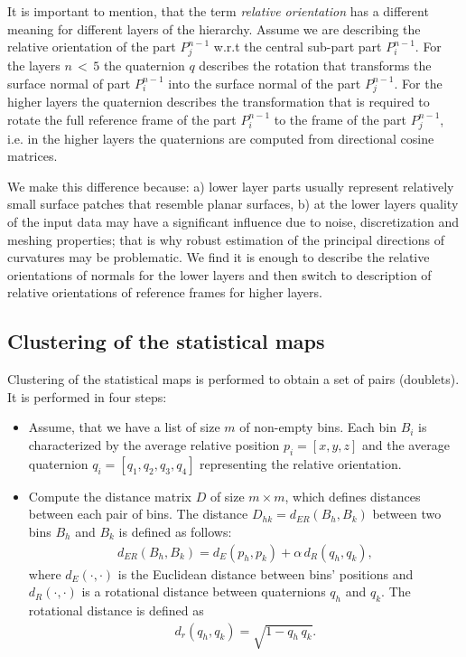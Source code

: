 \documentclass[conference]{IEEEtran}
\begin{document}
{    It is important to mention, that the term \emph{relative orientation}
    has a different meaning for different layers of the hierarchy. Assume
    we are describing the relative orientation of the part $P_j^{n-1}$ w.r.t the central sub-part
    part $P_i^{n-1}$. For the layers $n\,{<}\,5$ the quaternion $q$ describes
    the rotation that transforms the surface normal of part $P_i^{n-1}$ into the surface normal
    of the part $P_j^{n-1}$. For the higher layers the quaternion
    describes the
    transformation that is required to rotate the full reference frame of the part $P_i^{n-1}$ to the
    frame of the part $P_j^{n-1}$, i.e. in the higher layers the quaternions are computed from
    directional cosine matrices.

    We make this difference because: a) lower layer parts usually represent relatively small
    surface patches that resemble planar surfaces, b) at the lower layers
    quality of the input data may have a significant influence due to noise,
    discretization and meshing properties; that is why robust estimation of the principal
    directions of curvatures may be problematic. We find it is enough to
    describe the
    relative orientations of normals for the lower layers and then
    switch to description of relative orientations of reference frames for higher layers.



\subsection{Clustering of the statistical maps\label{sec:Clustering}}

Clustering of the statistical maps is performed to obtain a set of
pairs (doublets). It is performed in four steps:

\begin{itemize}
    \item Assume, that we have a list of size $m$ of non-empty bins. Each bin $B_i$ is
    characterized by the average relative position $p_i = [x,y,z]$ and the average quaternion $q_i = [q_1,q_2,q_3,q_4]$ representing
    the relative orientation.
    \item Compute the distance matrix $D$ of size $m \times m$,
    which defines distances between each pair of bins.
    The distance $D_{hk} = d_{ER}(B_h, B_k)$ between two bins $B_h$ and $B_k$ is defined as follows:
    \begin{align}
        d_{ER}(B_h, B_k) = d_E(p_h, p_k) + \alpha \, d_R(q_h, q_k),
    \end{align}
    where $d_E(\cdot,\cdot)$ is the Euclidean distance between
    bins' positions and $d_R(\cdot,\cdot)$ is a rotational distance
    between quaternions $q_h$ and $q_k$.
    The rotational distance is defined as
    \begin{align}
        d_r(q_h, q_k) = \sqrt{1 - q_h \, q_k}.
    \end{align}


\end{itemize}}
\end{document}
